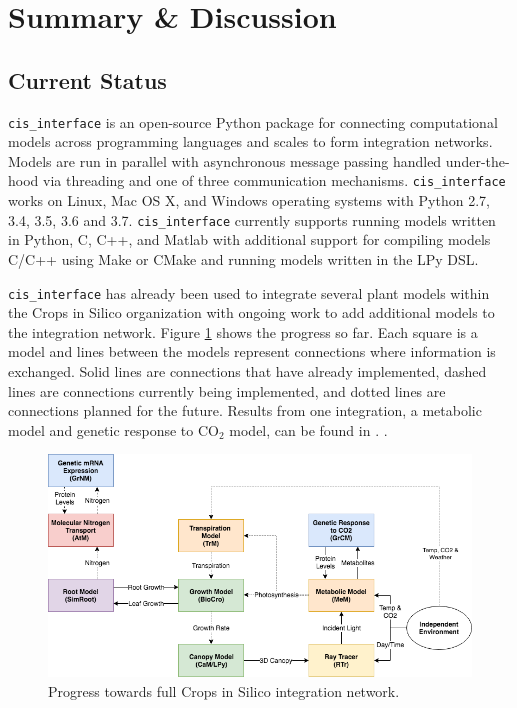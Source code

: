 \documentclass[journal]{IEEEtran}
\newcommand{\todo}[1]{{\color{red}{#1}}}
\newcommand{\cis}{{\tt cis\_interface}{}}
\begin{document}
\section{Summary \& Discussion}\label{S:discuss}

\subsection{Current Status}\label{SS:current}
%
{\cis} is an open-source Python package for connecting computational models across programming languages and scales to form integration networks. Models are run in parallel with asynchronous message passing handled under-the-hood via threading and one of three communication mechanisms. {\cis} works on Linux, Mac OS X, and Windows operating systems with Python 2.7, 3.4, 3.5, 3.6 and 3.7. {\cis} currently supports running models written in Python, C, C++, and Matlab with additional support for compiling models C/C++ using Make \citep{Stallman2004} or CMake \citep{Martin2006} and running models written in the LPy \citep{Boudon2012} DSL.

{\cis} has already been used to integrate several plant models within the Crops in Silico organization with ongoing work to add additional models to the integration network. Figure \ref{fig:network} shows the progress so far. Each square is a model and lines between the models represent connections where information is exchanged. Solid lines are connections that have already implemented, dashed lines are connections currently being implemented, and dotted lines are connections planned for the future. Results from one integration, a metabolic model and genetic response to CO$_2$ model, can be found in 
%
\ifieee
	\citep{integration_prep}. 
\else
	\citet{integration_prep}. 
\fi
%
\ifinclfig
 	\begin{figure}[htbp]
	\begin{center}
	\includegraphics[width=\columnwidth,keepaspectratio]{./images/CiS-BioCro-Planned.png}
	\caption{Progress towards full Crops in Silico integration network.}
	\label{fig:network}
	\end{center}
	\end{figure}
\fi
%
\end{document}
